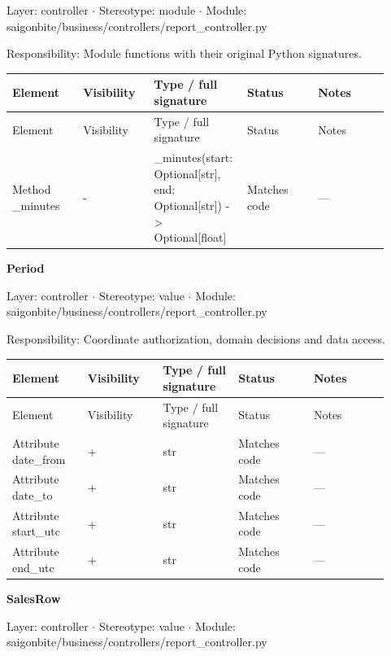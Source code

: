 Layer: controller \ensuremath{\cdot} Stereotype: \guillemotleft{}module\guillemotright{} \ensuremath{\cdot} Module: saigonbite/business/controllers/report\_controller.py

Responsibility: Module functions with their original Python signatures.

\begin{longtable}{>{\raggedright\arraybackslash}p{0.1840\linewidth}>{\raggedright\arraybackslash}p{0.1840\linewidth}>{\raggedright\arraybackslash}p{0.1840\linewidth}>{\raggedright\arraybackslash}p{0.1840\linewidth}>{\raggedright\arraybackslash}p{0.1840\linewidth}}
Element & Visibility & Type / full signature & Status & Notes \\
\hline\endfirsthead
Element & Visibility & Type / full signature & Status & Notes \\
\hline\endhead
Method \_minutes & - & \_minutes(start: Optional[str], end: Optional[str]) -\textgreater{} Optional[float] & Matches code & --- \\
\end{longtable}
\textbf{Period}

Layer: controller \ensuremath{\cdot} Stereotype: \guillemotleft{}value\guillemotright{} \ensuremath{\cdot} Module: saigonbite/business/controllers/report\_controller.py

Responsibility: Coordinate authorization, domain decisions and data access.

\begin{longtable}{>{\raggedright\arraybackslash}p{0.1840\linewidth}>{\raggedright\arraybackslash}p{0.1840\linewidth}>{\raggedright\arraybackslash}p{0.1840\linewidth}>{\raggedright\arraybackslash}p{0.1840\linewidth}>{\raggedright\arraybackslash}p{0.1840\linewidth}}
Element & Visibility & Type / full signature & Status & Notes \\
\hline\endfirsthead
Element & Visibility & Type / full signature & Status & Notes \\
\hline\endhead
Attribute date\_from & + & str & Matches code & --- \\
Attribute date\_to & + & str & Matches code & --- \\
Attribute start\_utc & + & str & Matches code & --- \\
Attribute end\_utc & + & str & Matches code & --- \\
\end{longtable}
\textbf{SalesRow}

Layer: controller \ensuremath{\cdot} Stereotype: \guillemotleft{}value\guillemotright{} \ensuremath{\cdot} Module: saigonbite/business/controllers/report\_controller.py

